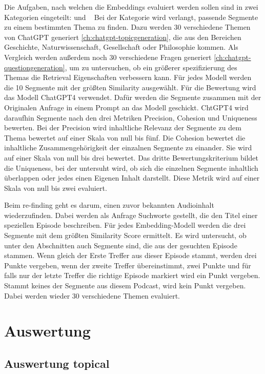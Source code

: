 Die Aufgaben, nach welchen die Embeddings evaluiert werden sollen sind in zwei Kategorien eingeteilt:
 und ~\cite{jones2021}
Bei der Kategorie  wird verlangt, passende Segmente zu einem bestimmten Thema zu finden.
Dazu werden 30 verschiedene Themen von ChatGPT generiert \ref{ch:chatgpt-topicgeneration}, die aus den Bereichen Geschichte, Naturwissenschaft, Gesellschaft oder Philosophie kommen.
Als Vergleich werden außerdem noch 30 verschiedene Fragen generiert \ref{ch:chatgpt-questiongeneration}, um zu untersuchen, ob ein größerer spezifizierung des Themas die Retrieval Eigenschaften verbessern kann. 
Für jedes Modell werden die 10 Segmente mit der größten Similarity ausgewählt.
Für die Bewertung wird das Modell ChatGPT4 verwendet.
Dafür werden die Segmente zusammen mit der Originalen Anfrage in einem Prompt an das Modell geschickt.
ChtGPT4 wird daraufhin Segmente nach den drei Metriken Precision, Cohesion und Uniqueness bewerten.
Bei der Precision wird inhaltliche Relevanz der Segmente zu dem Thema bewertet auf einer Skala von  null bis fünf.
Die Cohesion bewertet die inhaltliche Zusammengehörigkeit der einzalnen Segmente zu einander.
Sie wird auf einer Skala von null bis drei bewertet.
Das dritte Bewertungskriterium bildet die Uniqueness, bei der untersuht wird, ob sich die einzelnen Segmente inhaltlich überlappen oder jedes einen Eigenen Inhalt darstellt.
Diese Metrik wird auf einer Skala von null bis zwei evaluiert.


Beim re-finding geht es darum, einen zuvor bekannten Audioinhalt wiederzufinden.
Dabei werden als Anfrage Suchworte gestellt, die den Titel einer speziellen Episode beschreiben.
Für jedes Embedding-Modell werden die drei Segmente mit dem größten Similarity Score ermittelt.
Es wird untersucht, ob unter den Abschnitten auch Segmente sind, die aus der gesuchten Episode stammen.
Wenn gleich der Erste Treffer aus dieser Episode stammt, werden drei Punkte vergeben, wenn der zweite Treffer übereinstimmt, zwei Punkte und für falls nur der letzte Treffer die richtige Episode markiert wird ein Punkt vergeben.
Stammt keines der Segmente aus diesem Podcast, wird kein Punkt vergeben.
Dabei werden wieder 30 verschiedene Themen evaluiert.


\section{Auswertung}

\subsection{Auswertung topical}

